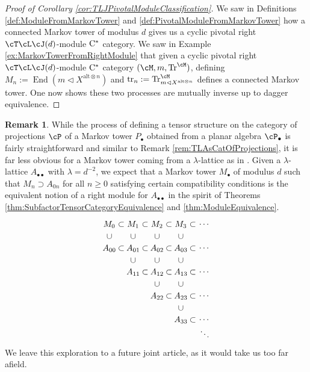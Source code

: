 \documentclass[11pt]{article}
\theoremstyle{plain}
\theoremstyle{definition}
\newtheorem{rem}[thm]{Remark}
\DeclareMathOperator{\End}{End}
\DeclareMathOperator{\Tr}{Tr}
\DeclareMathOperator{\tr}{tr}
\newcommand{\Cstar}{\rm{C^*}}
\begin{document}
\begin{proof}[Proof of Corollary \ref{cor:TLJPivotalModuleClassification}]
We saw in Definitions \ref{def:ModuleFromMarkovTower} and \ref{def:PivotalModuleFromMarkovTower} how a connected Markov tower of modulus $d$ gives us a cyclic pivotal right $\cT\cL\cJ(d)$-module $\Cstar$ category.
We saw in Example \ref{ex:MarkovTowerFromRightModule} that given a cyclic pivotal right $\cT\cL\cJ(d)$-module $\Cstar$ category $(\cM, m,\Tr^\cM)$, 
defining $M_n := \End(m \vartriangleleft X^{\text{alt}\otimes n})$ and $\tr_n := \Tr^\cM_{m \vartriangleleft X^{\text{alt}\otimes n}}$ defines a connected Markov tower.
One now shows these two processes are mutually inverse up to dagger equivalence.
\end{proof}


\begin{rem}
\label{rem:LambdaLatticeModule}
While the process of defining a tensor structure on the category of projections $\cP$ of a Markov tower $P_\bullet$ obtained from a planar algebra $\cP_\bullet$ is fairly straightforward and similar to Remark \ref{rem:TLAsCatOfProjections}, 
it is far less obvious for a Markov tower coming from a $\lambda$-lattice as in \cite{MR1334479}.
Given a $\lambda$-lattice $A_{\bullet\bullet}$ with $\lambda = d^{-2}$, we expect that a Markov tower $M_\bullet$ of modulus $d$ such that $M_n \supset A_{0n}$ for all $n\geq 0$ satisfying certain compatibility conditions is the equivalent notion of a right module for $A_{\bullet\bullet}$ in the spirit of Theorems \ref{thm:SubfactorTensorCategoryEquivalence} and \ref{thm:ModuleEquivalence}.
$$
\begin{tikzpicture}
 \node at (0,1) {$M_{0}$};
 \node at (.5,1) {$\subset$};
 \node at (1,1) {$M_{1}$};
 \node at (1.5,1) {$\subset$};
 \node at (2,1) {$M_{2}$};
 \node at (2.5,1) {$\subset$};
 \node at (3,1) {$M_{3}$};
 \node at (3.5,1) {$\subset$};
 \node at (4,1) {$\cdots$};
%
 \node at (0,.5) {$\cup$};
 \node at (1,.5) {$\cup$};
 \node at (2,.5) {$\cup$};
 \node at (3,.5) {$\cup$};
%
 \node at (0,0) {$A_{00}$};
 \node at (.5,0) {$\subset$};
 \node at (1,0) {$A_{01}$};
 \node at (1.5,0) {$\subset$};
 \node at (2,0) {$A_{02}$};
 \node at (2.5,0) {$\subset$};
 \node at (3,0) {$A_{03}$};
 \node at (3.5,0) {$\subset$};
 \node at (4,0) {$\cdots$};
%
 \node at (1,-.5) {$\cup$};
 \node at (2,-.5) {$\cup$};
 \node at (3,-.5) {$\cup$};
%
 \node at (1,-1) {$A_{11}$};
 \node at (1.5,-1) {$\subset$};
 \node at (2,-1) {$A_{12}$};
 \node at (2.5,-1) {$\subset$};
 \node at (3,-1) {$A_{13}$};
 \node at (3.5,-1) {$\subset$};
 \node at (4,-1) {$\cdots$};
%
 \node at (2,-1.5) {$\cup$};
 \node at (3,-1.5) {$\cup$};
%
 \node at (2,-2) {$A_{22}$};
 \node at (2.5,-2) {$\subset$};
 \node at (3,-2) {$A_{23}$};
 \node at (3.5,-2) {$\subset$};
 \node at (4,-2) {$\cdots$};
%
 \node at (3,-2.5) {$\cup$};
%
 \node at (3,-3) {$A_{33}$};
 \node at (3.5,-3) {$\subset$};
 \node at (4,-3) {$\cdots$};
%
 \node at (4,-3.5) {$\ddots$};
\end{tikzpicture}
$$
We leave this exploration to a future joint article, as it would take us too far afield.
\end{rem}
\end{document}
